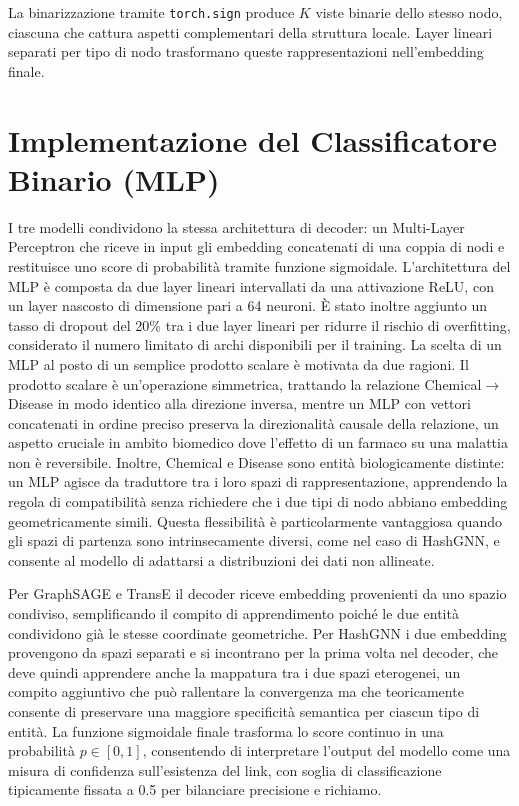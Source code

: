 La binarizzazione tramite \texttt{torch.sign} produce $K$ viste binarie dello stesso nodo, ciascuna che cattura aspetti complementari della struttura locale. Layer lineari separati per tipo di nodo trasformano queste rappresentazioni nell'embedding finale.


\section{Implementazione del Classificatore Binario (MLP)}

I tre modelli condividono la stessa architettura di decoder: un Multi-Layer Perceptron che riceve in input gli embedding concatenati di una coppia di nodi e restituisce uno score di probabilità tramite funzione sigmoidale. L'architettura del MLP è composta da due layer lineari intervallati da una attivazione ReLU, con un layer nascosto di dimensione pari a 64 neuroni. È stato inoltre aggiunto un tasso di dropout del 20\% tra i due layer lineari per ridurre il rischio di overfitting, considerato il numero limitato di archi disponibili per il training. La scelta di un MLP al posto di un semplice prodotto scalare è motivata da due ragioni. Il prodotto scalare è un'operazione simmetrica, trattando la relazione Chemical$\to$Disease in modo identico alla direzione inversa, mentre un MLP con vettori concatenati in ordine preciso preserva la direzionalità causale della relazione, un aspetto cruciale in ambito biomedico dove l'effetto di un farmaco su una malattia non è reversibile. Inoltre, Chemical e Disease sono entità biologicamente distinte: un MLP agisce da traduttore tra i loro spazi di rappresentazione, apprendendo la regola di compatibilità senza richiedere che i due tipi di nodo abbiano embedding geometricamente simili. Questa flessibilità è particolarmente vantaggiosa quando gli spazi di partenza sono intrinsecamente diversi, come nel caso di HashGNN, e consente al modello di adattarsi a distribuzioni dei dati non allineate.

Per GraphSAGE e TransE il decoder riceve embedding provenienti da uno spazio condiviso, semplificando il compito di apprendimento poiché le due entità condividono già le stesse coordinate geometriche. Per HashGNN i due embedding provengono da spazi separati e si incontrano per la prima volta nel decoder, che deve quindi apprendere anche la mappatura tra i due spazi eterogenei, un compito aggiuntivo che può rallentare la convergenza ma che teoricamente consente di preservare una maggiore specificità semantica per ciascun tipo di entità. La funzione sigmoidale finale trasforma lo score continuo in una probabilità $p \in [0, 1]$, consentendo di interpretare l'output del modello come una misura di confidenza sull'esistenza del link, con soglia di classificazione tipicamente fissata a 0.5 per bilanciare precisione e richiamo.


